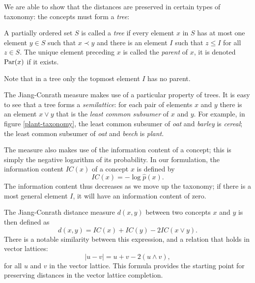 \documentclass{report}
\begin{document}
We are able to show that the distances are preserved in certain types of taxonomy: the concepts must form a \emph{tree}:
\begin{defn}[Trees]
A partially ordered set $S$ is called a \emph{tree} if every element $x$ in $S$ has at most one element $y\in S$ such that $x \prec y$ and there is an element $I$ such that $z \le I$ for all $z \in S$. The unique element preceding $x$ is called the \emph{parent} of $x$, it is denoted $\mathrm{Par}(x)$ if it exists.
\end{defn}
Note that in a tree only the topmost element $I$ has no parent.

The Jiang-Conrath measure makes use of a particular property of trees. It is easy to see that a tree forms a \emph{semilattice}: for each pair of elements $x$ and $y$ there is an element $x \lor y$ that is the \emph{least common subsumer} of $x$ and $y$. For example, in figure \ref{plant-taxonomy}, the least common subsumer of \emph{oat} and \emph{barley} is \emph{cereal}; the least common subsumer of \emph{oat} and \emph{beech} is \emph{plant}.

The measure also makes use of the information content of a concept; this is simply the negative logarithm of its probability. In our formulation, the information content $\mathit{IC}(x)$ of a concept $x$ is defined by
$$\mathit{IC}(x) = -\log \hat{p}(x).$$
The information content thus decreases as we move up the taxonomy; if there is a most general element $I$, it will have an information content of zero.

The Jiang-Conrath distance measure $d(x,y)$ between two concepts $x$ and $y$ is then defined as
$$d(x,y) = \mathit{IC}(x) + \mathit{IC}(y) - 2\mathit{IC}(x\lor y).$$
There is a notable similarity between this expression, and a relation that holds in vector lattices:
\begin{equation*}\tag{$*$}\label{vlid}|u - v| = u + v - 2(u\land v),\end{equation*}
for all $u$ and $v$ in the vector lattice. This formula provides the starting point for preserving distances in the vector lattice completion.
\end{document}
